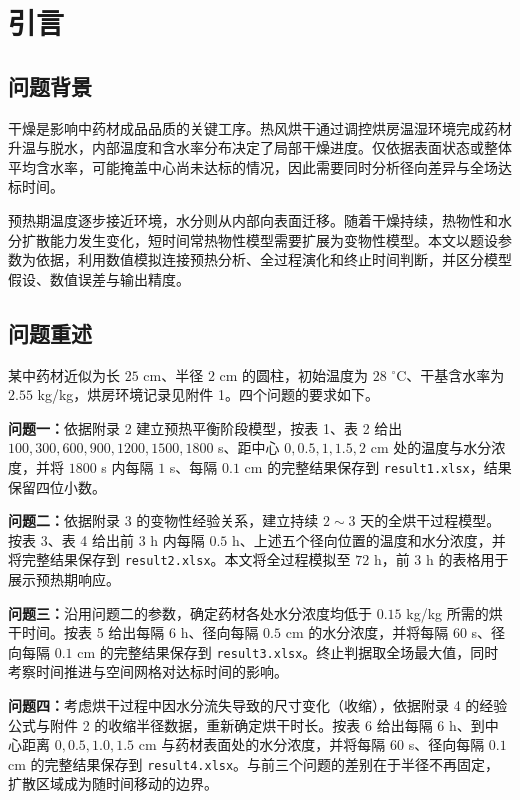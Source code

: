 \section{引言}

\subsection{问题背景}
干燥是影响中药材成品品质的关键工序。热风烘干通过调控烘房温湿环境完成药材升温与脱水，内部温度和含水率分布决定了局部干燥进度。仅依据表面状态或整体平均含水率，可能掩盖中心尚未达标的情况，因此需要同时分析径向差异与全场达标时间。

预热期温度逐步接近环境，水分则从内部向表面迁移。随着干燥持续，热物性和水分扩散能力发生变化，短时间常热物性模型需要扩展为变物性模型。本文以题设参数为依据，利用数值模拟连接预热分析、全过程演化和终止时间判断，并区分模型假设、数值误差与输出精度。

\subsection{问题重述}
某中药材近似为长 $25$ cm、半径 $2$ cm 的圆柱，初始温度为 $28$ $^\circ$C、干基含水率为 $2.55$ kg/kg，烘房环境记录见附件 1。四个问题的要求如下。

\textbf{问题一：}依据附录 2 建立预热平衡阶段模型，按表 1、表 2 给出 $100,300,600,900,1200,1500,1800$ s、距中心 $0,0.5,1,1.5,2$ cm 处的温度与水分浓度，并将 $1800$ s 内每隔 $1$ s、每隔 $0.1$ cm 的完整结果保存到 \texttt{result1.xlsx}，结果保留四位小数。

\textbf{问题二：}依据附录 3 的变物性经验关系，建立持续 $2\sim3$ 天的全烘干过程模型。按表 3、表 4 给出前 $3$ h 内每隔 $0.5$ h、上述五个径向位置的温度和水分浓度，并将完整结果保存到 \texttt{result2.xlsx}。本文将全过程模拟至 $72$ h，前 $3$ h 的表格用于展示预热期响应。

\textbf{问题三：}沿用问题二的参数，确定药材各处水分浓度均低于 $0.15$ kg/kg 所需的烘干时间。按表 5 给出每隔 $6$ h、径向每隔 $0.5$ cm 的水分浓度，并将每隔 $60$ s、径向每隔 $0.1$ cm 的完整结果保存到 \texttt{result3.xlsx}。终止判据取全场最大值，同时考察时间推进与空间网格对达标时间的影响。

\textbf{问题四：}考虑烘干过程中因水分流失导致的尺寸变化（收缩），依据附录 4 的经验公式与附件 2 的收缩半径数据，重新确定烘干时长。按表 6 给出每隔 $6$ h、到中心距离 $0,0.5,1.0,1.5$ cm 与药材表面处的水分浓度，并将每隔 $60$ s、径向每隔 $0.1$ cm 的完整结果保存到 \texttt{result4.xlsx}。与前三个问题的差别在于半径不再固定，扩散区域成为随时间移动的边界。
